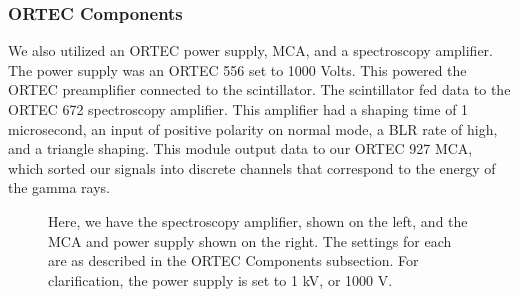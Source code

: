 \documentclass[10pt,letterpaper,onecolumn]{article}
\begin{document}
\subsubsection{ORTEC Components}
We also utilized an ORTEC power supply, MCA, and a spectroscopy amplifier. The power supply was an ORTEC 556 set to 1000 Volts. This powered the ORTEC preamplifier connected to the scintillator. The scintillator fed data to the ORTEC 672 spectroscopy amplifier. This amplifier had a shaping time of 1 microsecond, an input of positive polarity on normal mode, a BLR rate of high, and a triangle shaping. This module output data to our ORTEC 927 MCA, which sorted our signals into discrete channels that correspond to the energy of the gamma rays.
\begin{figure}
    \begin{center}
        \qquad
        \caption{Here, we have the spectroscopy amplifier, shown on the left, and the MCA and power supply shown on the right. The settings for each are as described in the ORTEC Components subsection. For clarification, the power supply is set to 1 kV, or 1000 V.}%
        \label{fig:apparatus}%
    \end{center}
\end{figure}
\end{document}
